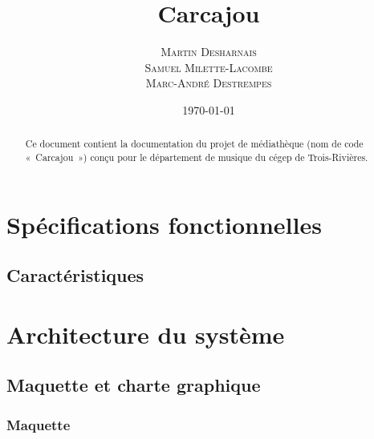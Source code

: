\documentclass[letter, 10pt]{report}
\title{Carcajou}
\author{\textsc{Martin Desharnais} \\ \textsc{Samuel Milette-Lacombe} \\ \textsc{Marc-André Destrempes}}
\date{\today}
\begin{document}
\maketitle

\begin{abstract}
Ce document contient la documentation du projet de médiathèque (nom de code «~Carcajou~») conçu pour le département de musique du cégep de Trois-Rivières.
\end{abstract}

\newpage
\tableofcontents
\newpage

\chapter{Spécifications fonctionnelles}

\section{Caractéristiques}

\chapter{Architecture du système}

\section{Maquette et charte graphique}

\subsection{Maquette}
\end{document}
